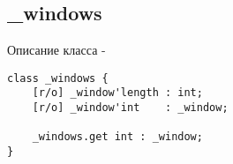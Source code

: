 \subsection{{\color{orange} \_windows}}

\noindent Описание класса  -
\begin{lstlisting}[numbers=none]
class _windows {
	[r/o] _window'length : int;
	[r/o] _window'int    : _window;
	
	_windows.get int : _window;
}
\end{lstlisting}


